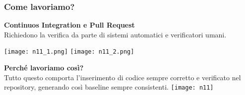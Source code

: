\begin{frame}
\frametitle{Come lavoriamo?}
  	\textbf{Continuos Integration e Pull Request}\\
  	Richiedono la verifica da parte di sistemi automatici e verificatori umani.\\
	\begin{flushright}	 	
  		\texttt{[image: n11\_1.png]}
		\texttt{[image: n11\_2.png]}
	\end{flushright}
  	\par \textbf{Perché lavoriamo così?}\\ 
  	Tutto questo comporta l’inserimento di codice
sempre corretto e verificato nel repository, generando così baseline sempre consistenti.
	\texttt{[image: n11]}
\end{frame}


